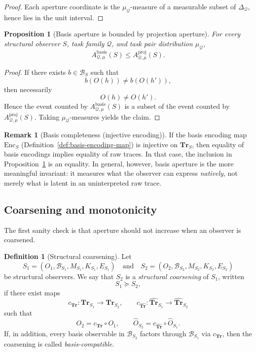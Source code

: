 \documentclass[11pt,twoside]{article}
\newtheorem{proposition}[theorem]{Proposition}
\theoremstyle{definition}
\newtheorem{definition}[theorem]{Definition}
\newtheorem{remark}[theorem]{Remark}
\newcommand{\Tr}{\mathbf{Tr}}
\newcommand{\Enc}{\mathrm{Enc}}
\newcommand{\proj}{\mathrm{proj}}
\newcommand{\basis}{\mathrm{basis}}
\begin{document}
\begin{proof}
Each aperture coordinate is the \(\mu_{\mathcal{Q}}\)-measure of a measurable subset of \(\Delta_{\mathcal{Q}}\), hence lies in the unit interval.
\end{proof}

\begin{proposition}[Basis aperture is bounded by projection aperture]
\label{prop:basis-bounded-by-projection}
For every structural observer \(S\), task family \(\mathcal{Q}\), and task pair distribution \(\mu_{\mathcal{Q}}\),
\[
  A^{\basis}_{\mathcal{Q},\mu}(S)
  \le
  A^{\proj}_{\mathcal{Q},\mu}(S).
\]
\end{proposition}

\begin{proof}
If there exists \(b\in\mathcal{B}_S\) such that
\[
  b(O(h)) \neq b(O(h')),
\]
then necessarily
\[
  O(h)\neq O(h').
\]
Hence the event counted by \(A^{\basis}_{\mathcal{Q},\mu}(S)\) is a subset of the event counted by \(A^{\proj}_{\mathcal{Q},\mu}(S)\). Taking \(\mu_{\mathcal{Q}}\)-measures yields the claim.
\end{proof}

\begin{remark}[Basis completeness (injective encoding)]
\label{rem:basis-completeness}
If the basis encoding map \(\Enc_S\) (Definition~\ref{def:basis-encoding-map}) is injective on \(\Tr_S\), then equality of basis encodings implies equality of raw traces. In that case, the inclusion in Proposition~\ref{prop:basis-bounded-by-projection} is an equality. In general, however, basis aperture is the more meaningful invariant: it measures what the observer can express \emph{natively}, not merely what is latent in an uninterpreted raw trace.
\end{remark}

\subsection{Coarsening and monotonicity}
\label{subsec:coarsening-and-monotonicity}

The first sanity check is that aperture should not increase when an observer is coarsened.

\begin{definition}[Structural coarsening]
\label{def:structural-coarsening}
Let
\[
  S_1=(O_1,\mathcal{B}_{S_1},M_{S_1},K_{S_1},E_{S_1})
  \quad\text{and}\quad
  S_2=(O_2,\mathcal{B}_{S_2},M_{S_2},K_{S_2},E_{S_2})
\]
be structural observers. We say that \(S_2\) is a \emph{structural coarsening} of \(S_1\), written
\[
  S_1 \succeq S_2,
\]
if there exist maps
\[
  c_{\Tr} : \Tr_{S_1}\to \Tr_{S_2},
  \qquad
  c_{\widehat{\Tr}} : \widehat{\Tr}_{S_1}\to \widehat{\Tr}_{S_2}
\]
such that
\[
  O_2 = c_{\Tr}\circ O_1,
  \qquad
  \widehat{O}_{S_2} = c_{\widehat{\Tr}}\circ \widehat{O}_{S_1}.
\]
If, in addition, every basis observable in \(\mathcal{B}_{S_2}\) factors through \(\mathcal{B}_{S_1}\) via \(c_{\Tr}\), then the coarsening is called \emph{basis-compatible}.
\end{definition}
\end{document}
